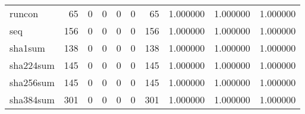 \begin{longtable}{lrrrrrrrrr}
runcon    &                                    65 &                                                  0 &                                                  0 &                                                  0 &                                                  0 &                                                 65 &                                           1.000000 &                               1.000000 &                             1.000000 \\
seq       &                                   156 &                                                  0 &                                                  0 &                                                  0 &                                                  0 &                                                156 &                                           1.000000 &                               1.000000 &                             1.000000 \\
sha1sum   &                                   138 &                                                  0 &                                                  0 &                                                  0 &                                                  0 &                                                138 &                                           1.000000 &                               1.000000 &                             1.000000 \\
sha224sum &                                   145 &                                                  0 &                                                  0 &                                                  0 &                                                  0 &                                                145 &                                           1.000000 &                               1.000000 &                             1.000000 \\
sha256sum &                                   145 &                                                  0 &                                                  0 &                                                  0 &                                                  0 &                                                145 &                                           1.000000 &                               1.000000 &                             1.000000 \\
sha384sum &                                   301 &                                                  0 &                                                  0 &                                                  0 &                                                  0 &                                                301 &                                           1.000000 &                               1.000000 &                             1.000000 \\

\end{longtable}
